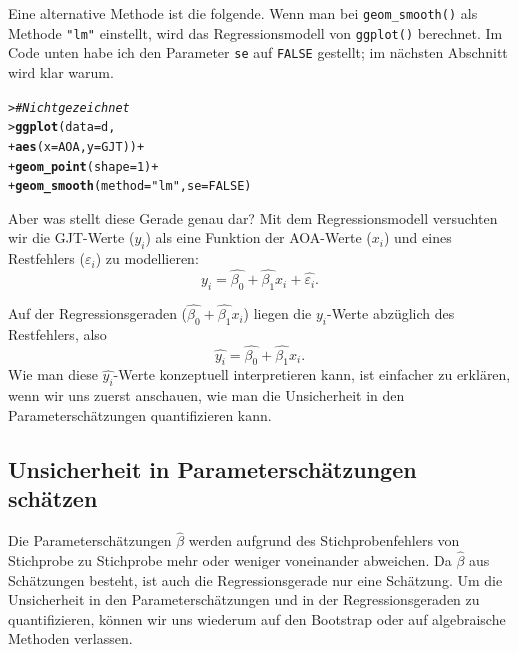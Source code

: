 \documentclass[oneside, 10pt]{book}\usepackage[]{graphicx}\usepackage[]{xcolor}
\makeatletter
\newcommand{\hlnum}[1]{\textcolor[rgb]{0.686,0.059,0.569}{#1}}%
\newcommand{\hlstr}[1]{\textcolor[rgb]{0.192,0.494,0.8}{#1}}%
\newcommand{\hlcom}[1]{\textcolor[rgb]{0.678,0.584,0.686}{\textit{#1}}}%
\newcommand{\hlopt}[1]{\textcolor[rgb]{0,0,0}{#1}}%
\newcommand{\hlstd}[1]{\textcolor[rgb]{0.345,0.345,0.345}{#1}}%
\newcommand{\hlkwc}[1]{\textcolor[rgb]{0.333,0.667,0.333}{#1}}%
\newcommand{\hlkwd}[1]{\textcolor[rgb]{0.737,0.353,0.396}{\textbf{#1}}}%
\newenvironment{kframe}{%
 \def\at@end@of@kframe{}%
 \ifinner\ifhmode%
  \def\at@end@of@kframe{\end{minipage}}%
  \begin{minipage}{\columnwidth}%
 \fi\fi%
 \def\FrameCommand##1{\hskip\@totalleftmargin \hskip-\fboxsep
 \colorbox{shadecolor}{##1}\hskip-\fboxsep
     \hskip-\linewidth \hskip-\@totalleftmargin \hskip\columnwidth}%
 \MakeFramed {\advance\hsize-\width
   \@totalleftmargin\z@ \linewidth\hsize
   \@setminipage}}%
 {\par\unskip\endMakeFramed%
 \at@end@of@kframe}
\newenvironment{knitrout}{}{} %
\makeatother
\begin{document}
Eine alternative Methode ist die folgende.
Wenn man bei \texttt{geom\_smooth()} als Methode \texttt{"lm"} einstellt,
wird das Regressionsmodell von \texttt{ggplot()} berechnet.
Im Code unten habe ich den Parameter \texttt{se} auf \texttt{FALSE}
gestellt; im nächsten Abschnitt wird klar warum.
\begin{knitrout}
\color{fgcolor}\begin{kframe}
\begin{alltt}
\hlstd{> }\hlcom{# Nicht gezeichnet}
\hlstd{> }\hlkwd{ggplot}\hlstd{(}\hlkwc{data} \hlstd{= d,}
\hlstd{+ }       \hlkwd{aes}\hlstd{(}\hlkwc{x} \hlstd{= AOA,} \hlkwc{y} \hlstd{= GJT))} \hlopt{+}
\hlstd{+ }  \hlkwd{geom_point}\hlstd{(}\hlkwc{shape} \hlstd{=} \hlnum{1}\hlstd{)} \hlopt{+}
\hlstd{+ }  \hlkwd{geom_smooth}\hlstd{(}\hlkwc{method} \hlstd{=} \hlstr{"lm"}\hlstd{,} \hlkwc{se} \hlstd{=} \hlnum{FALSE}\hlstd{)}
\end{alltt}
\end{kframe}
\end{knitrout}

Aber was stellt diese Gerade genau dar?  Mit dem Regressionsmodell versuchten
wir die GJT-Werte ($y_i$) als eine Funktion der AOA-Werte ($x_i$) und eines
Restfehlers ($\varepsilon_i$) zu modellieren:
\[
y_i = \widehat{\beta_0} + \widehat{\beta_1}x_i + \widehat{\varepsilon_i}.
\]

Auf der Regressionsgeraden ($\widehat{\beta_0} + \widehat{\beta_1}x_i$)
liegen die $y_i$-Werte abzüglich des Restfehlers, also
\[
\widehat{y_i} = \widehat{\beta_0} + \widehat{\beta_1}x_i.
\]
Wie man diese $\widehat{y_i}$-Werte konzeptuell interpretieren
kann, ist einfacher zu erklären, wenn wir uns zuerst anschauen, wie
man die Unsicherheit in den Parameterschätzungen quantifizieren kann.

\subsection{Unsicherheit in Parameterschätzungen schätzen}
Die Parameterschätzungen $\widehat{\beta}$ werden aufgrund
des Stichprobenfehlers von Stichprobe zu Stichprobe mehr oder
weniger voneinander abweichen. Da $\widehat{\beta}$ aus Schätzungen
besteht, ist auch die Regressionsgerade nur eine Schätzung.
Um die Unsicherheit in den Parameterschätzungen und in der Regressionsgeraden
zu quantifizieren, können wir uns wiederum auf den Bootstrap oder
auf algebraische Methoden verlassen.
\end{document}
